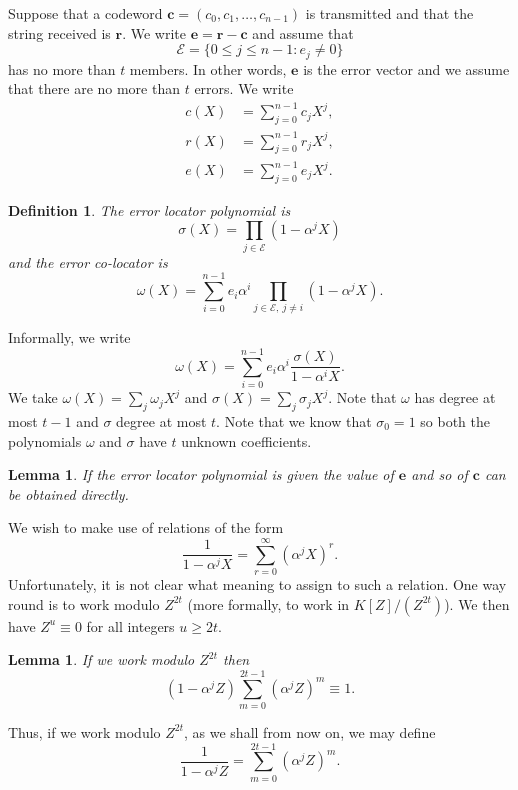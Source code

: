 \documentclass[12pt,a4paper]{article}
\theoremstyle{plain}
\newtheorem{lemma}[theorem]{Lemma}
\newtheorem{definition}[theorem]{Definition}
\theoremstyle{definition}
\begin{document}
Suppose that a codeword
${\mathbf c}=(c_{0},c_{1},\dots,c_{n-1})$ is
transmitted and that the string received is
${\mathbf r}$. We write
${\mathbf e}={\mathbf r}-{\mathbf c}$
and assume that
\[{\mathcal E}=\{0\leq j\leq n-1:e_{j}\neq 0\}\]
has no more than $t$ members.
In other words, ${\mathbf e}$ is the error vector
and we assume that there are no more than
$t$ errors.
We write
\begin{align*}
c(X)&=\sum_{j=0}^{n-1}c_{j}X^{j},\\
r(X)&=\sum_{j=0}^{n-1}r_{j}X^{j},\\
e(X)&=\sum_{j=0}^{n-1}e_{j}X^{j}.
\end{align*}


\begin{definition} The \emph{error locator polynomial} is
\[\sigma(X)=\prod_{j\in{\mathcal E}}(1-\alpha^{j}X)\]
and the \emph{error co-locator} is
\[\omega(X)=\sum_{i=0}^{n-1}e_{i}\alpha^{i}
\prod_{j\in{\mathcal E},\ j\neq i}(1-\alpha^{j}X).\]
\end{definition}
\noindent
Informally, we write
\[\omega(X)=\sum_{i=0}^{n-1}e_{i}\alpha^{i}
\frac{\sigma(X)}{1-\alpha^{i}X}.\]
We take $\omega(X)=\sum_{j}\omega_{j}X^{j}$ and
$\sigma(X)=\sum_{j}\sigma_{j}X^{j}$. Note that
$\omega$ has degree at most $t-1$ and $\sigma$
degree at most $t$. Note that we know that
$\sigma_{0}=1$ so both the polynomials
$\omega$ and $\sigma$ have $t$ unknown coefficients.
\begin{lemma} If the error locator polynomial
is given the value of ${\mathbf e}$ and so of ${\mathbf c}$
can be obtained directly.
\end{lemma}


We wish to make use of relations of the form
\[\frac{1}{1-\alpha^{j}X}=\sum_{r=0}^{\infty}(\alpha^{j}X)^{r}.\]
Unfortunately, it is not clear what meaning to assign
to such a relation. One way round is to work modulo $Z^{2t}$
(more formally, to work in $K[Z]/(Z^{2t})$). We then
have $Z^{u}\equiv 0$ for all integers $u\geq 2t$.
\begin{lemma} If we work modulo $Z^{2t}$ then
\[(1-\alpha^{j}Z)\sum_{m=0}^{2t-1}(\alpha^{j}Z)^{m}\equiv 1.\]
\end{lemma}
Thus, if we work modulo
$Z^{2t}$, as we shall from now on,
we may define
\[\frac{1}{1-\alpha^{j}Z}=\sum_{m=0}^{2t-1}(\alpha^{j}Z)^{m}.\]
\end{document}
